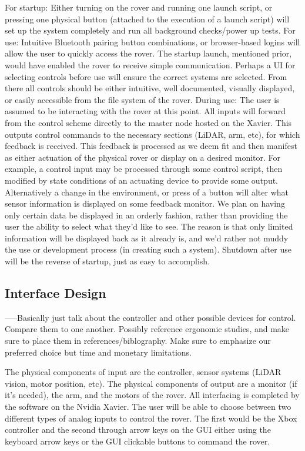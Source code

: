 \documentclass[a4paper, 10pt]{article}
\begin{document}
	For startup: Either turning on the rover and running one launch script, or pressing one physical button (attached to the execution of a launch script) will set up the system completely and run all background checks/power up tests. 
For use: Intuitive Bluetooth pairing button combinations, or browser-based logins will allow the user to quickly access the rover. The startup launch, mentioned prior, would have enabled the rover to receive simple communication. Perhaps a UI for selecting controls before use will ensure the correct systems are selected. From there all controls should be either intuitive, well documented, visually displayed, or easily accessible from the file system of the rover. 
During use: The user is assumed to be interacting with the rover at this point. All inputs will forward from the control scheme directly to the master node hosted on the Xavier. This outputs control commands to the necessary sections (LiDAR, arm, etc), for which feedback is received. This feedback is processed as we deem fit and then manifest as either actuation of the physical rover or display on a desired monitor. For example, a control input may be processed through some control script, then modified by state conditions of an actuating device to provide some output. Alternatively a change in the environment, or press of a button will alter what sensor information is displayed on some feedback monitor. We plan on having only certain data be displayed in an orderly fashion, rather than providing the user the ability to select what they'd like to see. The reason is that only limited information will be displayed back as it already is, and we'd rather not muddy the use or development process (in creating such a system). Shutdown after use will be the reverse of startup, just as easy to accomplish.

	\subsection{Interface Design}
	-----Basically just talk about the controller and other possible devices for control. Compare them to one another. Possibly reference ergonomic studies, and make sure to place them in references/biblography. Make sure to emphasize our preferred choice but time and monetary limitations.
	
	The physical components of input are the controller, sensor systems (LiDAR vision, motor position, etc). The physical components of output are a monitor (if it’s needed), the arm, and the motors of the rover. All interfacing is completed by the software on the Nvidia Xavier. 
The user will be able to choose between two different types of analog inputs to control the rover. The first would be the Xbox controller and the second through arrow keys on the GUI either using the keyboard arrow keys or the GUI clickable buttons to command the rover.
\end{document}
